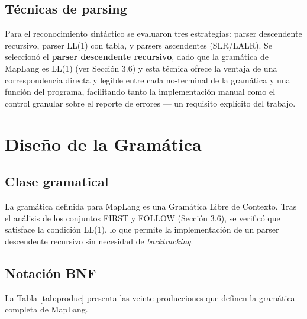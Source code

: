 \documentclass[10pt,twocolumn]{article}
\begin{document}
\subsection{Técnicas de parsing}

Para el reconocimiento sintáctico se evaluaron tres estrategias: parser
descendente recursivo, parser LL(1) con tabla, y parsers ascendentes
(SLR/LALR). Se seleccionó el \textbf{parser descendente recursivo}, dado
que la gramática de MapLang es LL(1) (ver Sección 3.6) y esta técnica
ofrece la ventaja de una correspondencia directa y legible entre cada
no-terminal de la gramática y una función del programa, facilitando tanto
la implementación manual como el control granular sobre el reporte de
errores --- un requisito explícito del trabajo.

\section{Diseño de la Gramática}

\subsection{Clase gramatical}

La gramática definida para MapLang es una Gramática Libre de Contexto.
Tras el análisis de los conjuntos FIRST y FOLLOW (Sección 3.6), se
verificó que satisface la condición LL(1), lo que permite la
implementación de un parser descendente recursivo sin necesidad de
\textit{backtracking}.

\subsection{Notación BNF}

La Tabla \ref{tab:produc} presenta las veinte producciones que definen la
gramática completa de MapLang.
\end{document}
